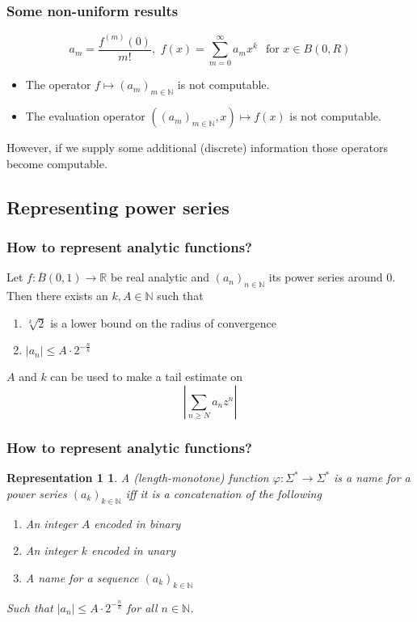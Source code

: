 \documentclass[xcolor=pdftex,dvipsnames,table]{beamer}
\newcommand{\N}{\ensuremath{\mathbb{N}}}
\newcommand{\R}{\ensuremath{\mathbb{R}}}
\newcommand{\abs}[1]{\left|#1\right|}
\newtheorem{representation1}{Representation 1}
\begin{document}
\begin{frame}
\frametitle{Some non-uniform results}
$$a_m =\frac{f^{(m)}(0)}{m!} 
, \,\, f(x) = \sum_{m=0}^\infty a_mx^k \,\ \text{ for } x \in B(0,R)
$$
\vfill
\begin{theorem}[M\"uller (1995)]
\begin{itemize}
\item The operator $f \mapsto (a_m)_{m \in \N}$ is not computable.
\item The evaluation operator $((a_m)_{m \in \N},x) \mapsto f(x) $ is not computable.
\end{itemize}
\end{theorem}
\pause
However, if we supply some additional (discrete) information those operators become computable.
\end{frame}
\subsection*{Representing power series}
\begin{frame}
\frametitle{How to represent analytic functions?}
\begin{lemma}
  Let $f : \overline B(0,1) \to \R$ be real analytic and $(a_n)_{n \in \N}$ its power series around $0$.\\
  Then there exists an $k,A \in \N$ such that 
  \begin{enumerate}
  \item $\sqrt[k]{2}$ is a lower bound on the radius of convergence
  \item $\abs{a_n} \leq A \cdot 2^{-\frac{n}{k}}$
  \end{enumerate}
\end{lemma}
\pause
$A$ and $k$ can be used to make a tail estimate on
$$ \left | \sum_{n \geq N} a_n z^n \right |  $$
\end{frame}
\begin{frame}
\frametitle{How to represent analytic functions?}
\begin{representation1}
  A (length-monotone) function $\varphi: \Sigma^* \to \Sigma^*$ is a name for a power series $(a_k)_{k \in \N}$ iff it is a concatenation of the following
  \begin{enumerate}
  \item An integer $A$ encoded in binary
  \item An integer $k$ encoded in unary
  \item A name for a sequence $(a_k)_{k \in \N}$
  \end{enumerate}
  Such that $\abs{a_n} \leq A \cdot 2^{-\frac{n}{k}}$ for all $n \in \N$.
\end{representation1}
\end{frame}
\end{document}

